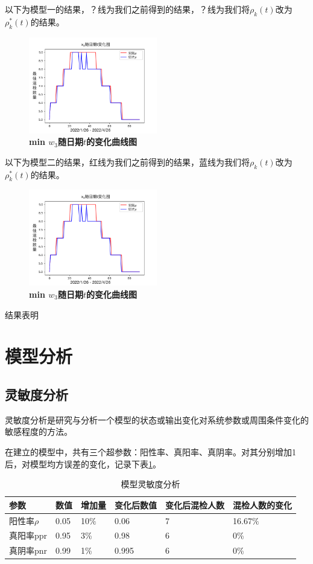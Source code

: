 \documentclass[withoutpreface,bwprint]{cumcmthesis} %
\begin{document}
以下为模型一的结果，？线为我们之前得到的结果，？线为我们将$\rho_k(t)$改为$\rho^*_k(t)$的结果。%
\begin{figure}[H]
\centering
\includegraphics[width=0.5\textwidth]{q3.png}%
\caption{\textbf{\rm{min} $w_3$随日期$t$的变化曲线图}}
\label{pro1}
\end{figure}

以下为模型二的结果，红线为我们之前得到的结果，蓝线为我们将$\rho_k(t)$改为$\rho^*_k(t)$的结果。
\begin{figure}[H]
\centering
\includegraphics[width=0.5\textwidth]{q3.png}
\caption{\textbf{\rm{min} $w_3$随日期$t$的变化曲线图}}
\label{pro1}
\end{figure}

结果表明


\section{模型分析}
\subsection{灵敏度分析}
灵敏度分析是研究与分析一个模型的状态或输出变化对系统参数或周围条件变化的敏感程度的方法。

在建立的模型中，共有三个超参数：阳性率、真阳率、真阴率。对其分别增加1后，对模型均方误差的变化，记录下表\ref{模型灵敏度分析}。

\begin{table}[H]
\caption{模型灵敏度分析}
\label{模型灵敏度分析}
\centering
\begin{tabular}{llllll}
\toprule
参数 & 数值   & 增加量 & 变化后数值 & 变化后混检人数 & 混检人数的变化\\
\midrule
阳性率$\rho$ & 0.05 & 10$\%$ & 0.06  & 7   & 16.67$\%$  \\
真阳率ppr  & 0.95 & 3\%  & 0.98  & 6   & 0\%   \\
真阴率pnr  & 0.99 & 1\%  & 0.995  & 6   & 0\%  \\
\bottomrule
\end{tabular}
\end{table}
\end{document}
